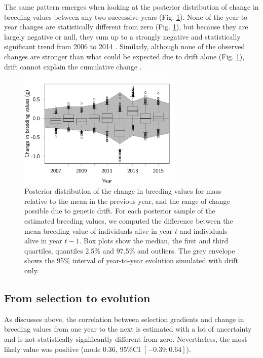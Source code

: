 The same pattern emerges when looking at the posterior distribution of change in breeding values between any two successive years (Fig. \ref{fig:evoldiff}). None of the year-to-year changes are statistically different from zero (Fig. \ref{fig:evoldiff}), but because they are largely negative or null, they sum up to a strongly negative and statistically significant trend from 2006 to 2014 \parencite{Bonnet2016}. Similarly, although none of the observed changes are stronger than what could be expected due to drift alone (Fig. \ref{fig:evoldiff}), drift cannot explain the cumulative change \parencite{Bonnet2016}.
 
\begin{figure}[ht]
\centering
\includegraphics[width=0.7\textwidth]{FiguresFluSel/EvolDiff-1}
\caption{\footnotesize Posterior distribution of the change in breeding values for mass relative to the mean in the previous year, and the range of change possible due to genetic drift. For each posterior sample of the estimated breeding values, we computed the difference between the mean breeding value of individuals alive in year $t$ and individuals alive in year $t-1$. Box plots show the median, the first and third quartiles, quantiles 2.5\% and 97.5\% and outliers. The grey envelope shows the 95\% interval of year-to-year evolution simulated with drift only.}
\label{fig:evoldiff}
\end{figure}

\subsection*{From selection to evolution}

As discusses above, the correlation between selection gradients and change in breeding values from one year to the next is estimated with a lot of uncertainty and is not statistically significantly different from zero. Nevertheless, the most likely value was positive (mode 0.36, 95\%CI $[-0.39; 0.64]$).

